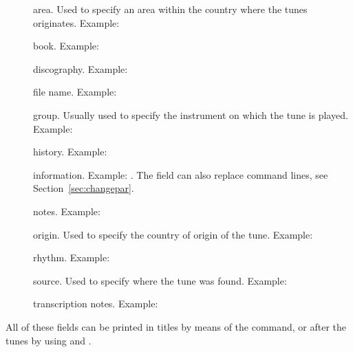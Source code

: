 \documentclass[a4paper,12pt]{book}
\begin{document}
\begin{description}
  
  \item [] area. Used to specify an area within the country
  where the tunes originates. Example: 
  
  \item [] book. Example: 
  
  \item [] discography. Example: 
  
  \item [] file name. Example:
  
  \item [] group. Usually used to specify the instrument on
  which the tune is played. Example: 
  
  \item [] history. Example: 
  
  \item [] information. Example:
  . The  field can also
  replace command lines, see Section~\ref{sec:changepar}.
  
  \item [] notes. Example:
  
  \item [] origin. Used to specify the country of origin
  of the tune. Example: 
  
  \item [] rhythm. Example: 
  
  \item [] source. Used to specify where the \ABC{} tune
  was found. Example: 
  
  \item [] transcription notes. Example:
  
\end{description}

All of these fields can be printed in titles by means of the
 command, or after the tunes by using
 and .
\end{document}
